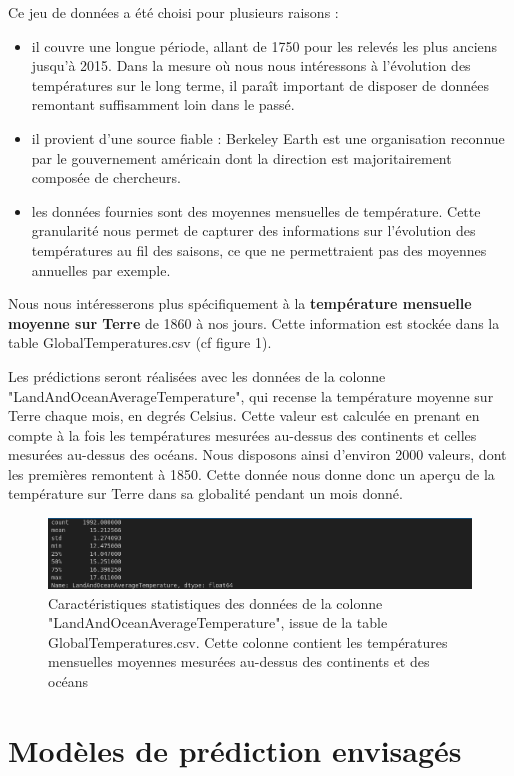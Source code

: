 \documentclass[french]{article}
\begin{document}
    Ce jeu de données a été choisi pour plusieurs raisons :
    \begin{itemize}
        \item il couvre une longue période, allant de 1750 pour les relevés les plus anciens jusqu'à 2015. Dans la mesure où nous nous intéressons à l'évolution des températures sur le long terme, il paraît important de disposer de données remontant suffisamment loin dans le passé.
        \item il provient d'une source fiable : Berkeley Earth est une organisation reconnue par le gouvernement américain dont la direction est majoritairement composée de chercheurs.
        \item les données fournies sont des moyennes mensuelles de température. Cette granularité nous permet de capturer des informations sur l'évolution des températures au fil des saisons, ce que ne permettraient pas des moyennes annuelles par exemple.
    \end{itemize}
    
    Nous nous intéresserons  plus spécifiquement à la \textbf{température mensuelle moyenne sur Terre} de 1860 à nos jours. Cette information est stockée dans la table GlobalTemperatures.csv (cf figure 1).
    


    Les prédictions seront réalisées avec les données de la colonne "LandAndOceanAverageTemperature", qui recense la température moyenne sur Terre chaque mois, en degrés Celsius. Cette valeur est calculée en prenant en compte à la fois les températures mesurées au-dessus des continents et celles mesurées au-dessus des océans. Nous disposons ainsi d'environ 2000 valeurs, dont les premières remontent à 1850. Cette donnée nous donne donc un aperçu de la température sur Terre dans sa globalité pendant un mois donné.
    \begin{figure}[h!]
        \includegraphics[width=12cm]{dataset}
        \centering
        \caption{Caractéristiques statistiques des données de la colonne "LandAndOceanAverageTemperature", issue de la table GlobalTemperatures.csv. Cette colonne contient les températures mensuelles moyennes mesurées au-dessus des continents et des océans}
        \centering
    \end{figure}
    \section{Modèles de prédiction envisagés}
\end{document}
